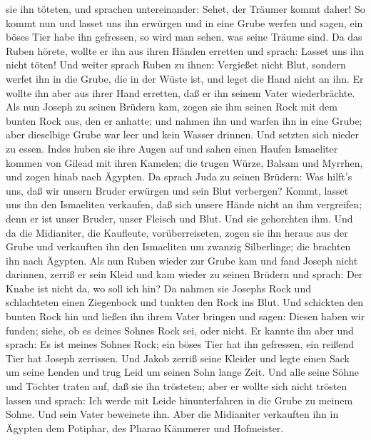 sie ihn töteten,  und sprachen untereinander: Sehet, der
Träumer kommt daher!  So kommt nun und lasset uns ihn
erwürgen und in eine Grube werfen und sagen, ein böses Tier habe ihn
gefressen, so wird man sehen, was seine Träume sind.  Da
das Ruben hörete, wollte er ihn aus ihren Händen erretten und sprach:
Lasset uns ihn nicht töten!  Und weiter sprach Ruben zu
ihnen: Vergießet nicht Blut, sondern werfet ihn in die Grube, die in der
Wüste ist, und leget die Hand nicht an ihn. Er wollte ihn aber aus ihrer
Hand erretten, daß er ihn seinem Vater wiederbrächte.  Als
nun Joseph zu seinen Brüdern kam, zogen sie ihm seinen Rock mit dem
bunten Rock aus, den er anhatte;  und nahmen ihn und warfen
ihn in eine Grube; aber dieselbige Grube war leer und kein Wasser
drinnen.  Und setzten sich nieder zu essen. Indes huben sie
ihre Augen auf und sahen einen Haufen Ismaeliter kommen von Gilead mit
ihren Kamelen; die trugen Würze, Balsam und Myrrhen, und zogen hinab
nach Ägypten.  Da sprach Juda zu seinen Brüdern: Was
hilft's uns, daß wir unsern Bruder erwürgen und sein Blut verbergen?
 Kommt, lasset uns ihn den Ismaeliten verkaufen, daß sich
unsere Hände nicht an ihm vergreifen; denn er ist unser Bruder, unser
Fleisch und Blut. Und sie gehorchten ihm.  Und da die
Midianiter, die Kaufleute, vorüberreiseten, zogen sie ihn heraus aus der
Grube und verkauften ihn den Ismaeliten um zwanzig Silberlinge; die
brachten ihn nach Ägypten.  Als nun Ruben wieder zur Grube
kam und fand Joseph nicht darinnen, zerriß er sein Kleid 
und kam wieder zu seinen Brüdern und sprach: Der Knabe ist nicht da, wo
soll ich hin?  Da nahmen sie Josephs Rock und schlachteten
einen Ziegenbock und tunkten den Rock ins Blut.  Und
schickten den bunten Rock hin und ließen ihn ihrem Vater bringen und
sagen: Diesen haben wir funden; siehe, ob es deines Sohnes Rock sei,
oder nicht.  Er kannte ihn aber und sprach: Es ist meines
Sohnes Rock; ein böses Tier hat ihn gefressen, ein reißend Tier hat
Joseph zerrissen.  Und Jakob zerriß seine Kleider und legte
einen Sack um seine Lenden und trug Leid um seinen Sohn lange Zeit.
 Und alle seine Söhne und Töchter traten auf, daß sie ihn
trösteten; aber er wollte sich nicht trösten lassen und sprach: Ich
werde mit Leide hinunterfahren in die Grube zu meinem Sohne. Und sein
Vater beweinete ihn.  Aber die Midianiter verkauften ihn in
Ägypten dem Potiphar, des Pharao Kämmerer und Hofmeister.

